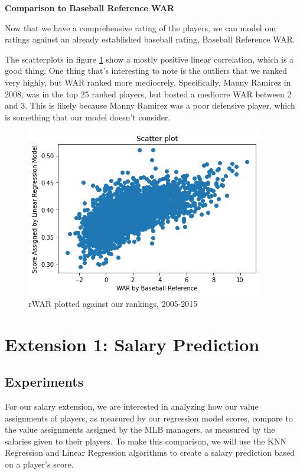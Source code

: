 \documentclass{article}
\begin{document}
\textbf{Comparison to Baseball Reference WAR}

Now that we have a comprehensive rating of the players, we can model our ratings against an already established baseball rating, Baseball Reference WAR. 

The scatterplots in figure \ref{fig:war} show a mostly positive linear correlation, which is a good thing. One thing that’s interesting to note is the outliers that we ranked very highly, but WAR ranked more mediocrely. Specifically, Manny Ramirez in 2008, was in the top 25 ranked players, but bosted a mediocre WAR between 2 and 3. This is likely because Manny Ramirez was a poor defensive player, which is something that our model doesn’t consider.

    \begin{figure}[h!]
    \begin{center}
      \includegraphics[scale=.5]{war.png}
      \end{center}
      \caption{rWAR plotted against our rankings, 2005-2015}
      \label{fig:war}
    \end{figure}



\section{Extension 1: Salary Prediction}
\label{salary}

    \subsection{Experiments}
    \label{experiments2}
    
    For our salary extension, we are interested in analyzing how our value assignments of players, as measured by our regression model scores, compare to the value assignments assigned by the MLB managers, as measured by the salaries given to their players. To make this comparison, we will use the KNN Regression and Linear Regression algorithms to create a salary prediction based on a player's score. 
\end{document}
